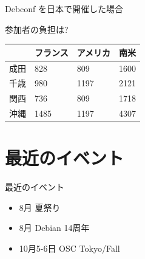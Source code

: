 \documentclass[cjk,dvipdfmx,12pt]{beamer}
\begin{document}
\begin{frame}{Debconf を日本で開催した場合}
 
参加者の負担は?

  \begin{tabularx}{\hsize}{|c|X|X|X|}
 \hline
 & フランス & アメリカ & 南米 \\
 \hline
成田 & 828 & 809 & 1600 \\
千歳 &980 & 1197 &2121 \\
関西 &736 & 809 &1718 \\
沖縄 &1485 & 1197 &4307 \\
 \hline
 \end{tabularx}


\end{frame}


\section{最近のイベント}
\begin{frame}{最近のイベント}
\begin{itemize}
 \item 8月 夏祭り
 \item 8月 Debian 14周年
 \item 10月5-6日 OSC Tokyo/Fall
\end{itemize}
\end{frame}
\end{document}
